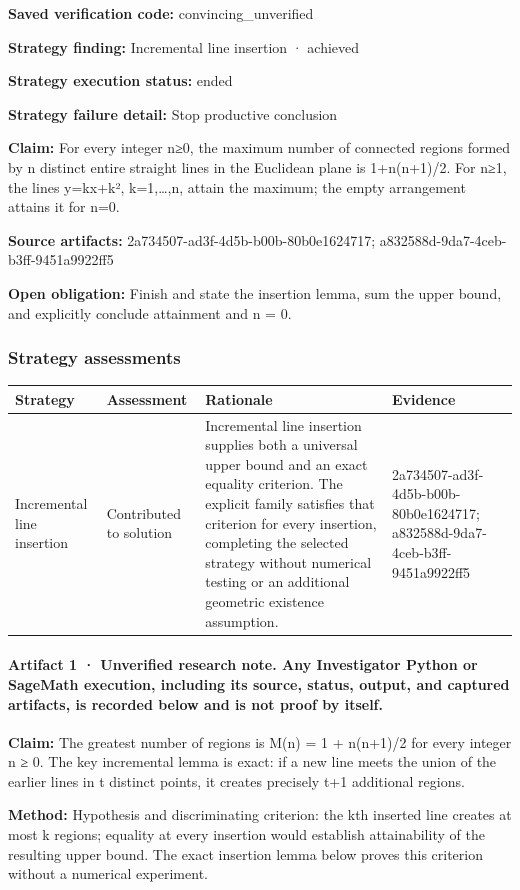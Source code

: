 \documentclass[11pt]{article}
\begin{document}
\textbf{Saved verification code:} convincing\_unverified\par
\textbf{Strategy finding:} Incremental line insertion · achieved\par
\textbf{Strategy execution status:} ended\par
\textbf{Strategy failure detail:} Stop productive conclusion\par
\textbf{Claim:} For every integer n≥0, the maximum number of connected regions formed by n distinct entire straight lines in the Euclidean plane is 1+n(n+1)/2. For n≥1, the lines y=kx+k², k=1,…,n, attain the maximum; the empty arrangement attains it for n=0.\par
\textbf{Source artifacts:} 2a734507-ad3f-4d5b-b00b-80b0e1624717; a832588d-9da7-4ceb-b3ff-9451a9922ff5\par
\textbf{Open obligation:} Finish and state the insertion lemma, sum the upper bound, and explicitly conclude attainment and n = 0.\par
\subsubsection*{Strategy assessments}
\begin{longtable}{>{\raggedright\arraybackslash}p{.16\linewidth}>{\raggedright\arraybackslash}p{.15\linewidth}>{\raggedright\arraybackslash}p{.40\linewidth}>{\raggedright\arraybackslash}p{.17\linewidth}}
\toprule Strategy & Assessment & Rationale & Evidence \\
\midrule\endhead
Incremental line insertion & Contributed to solution & Incremental line insertion supplies both a universal upper bound and an exact equality criterion. The explicit family satisfies that criterion for every insertion, completing the selected strategy without numerical testing or an additional geometric existence assumption. & 2a734507-ad3f-4d5b-b00b-80b0e1624717; a832588d-9da7-4ceb-b3ff-9451a9922ff5 \\
\bottomrule
\end{longtable}
\paragraph{Artifact 1 · Unverified research note. Any Investigator Python or SageMath execution, including its source, status, output, and captured artifacts, is recorded below and is not proof by itself.}
\textbf{Claim:} The greatest number of regions is M(n) = 1 + n(n+1)/2 for every integer n ≥ 0. The key incremental lemma is exact: if a new line meets the union of the earlier lines in t distinct points, it creates precisely t+1 additional regions.\par
\textbf{Method:} Hypothesis and discriminating criterion: the kth inserted line creates at most k regions; equality at every insertion would establish attainability of the resulting upper bound. The exact insertion lemma below proves this criterion without a numerical experiment.
\end{document}
